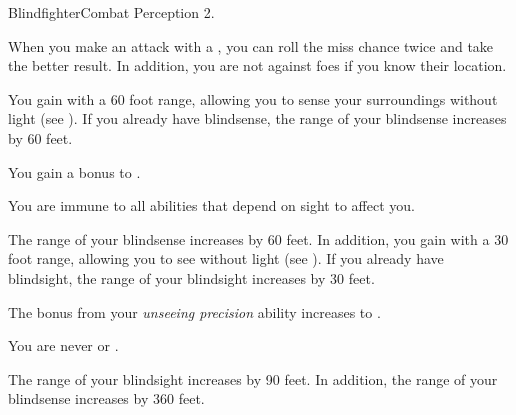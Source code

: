     \begin{feat}{Blindfighter}{Combat}
        \featpre Perception 2.

         When you make an attack with a , you can roll the miss chance twice and take the better result.
        In addition, you are not \partiallyunaware against foes if you know their location.

         You gain  with a 60 foot range, allowing you to sense your surroundings without light (see ).
        If you already have blindsense, the range of your blindsense increases by 60 feet.

         You gain a  bonus to .

         You are immune to all abilities that depend on sight to affect you.

         The range of your blindsense increases by 60 feet.
        In addition, you gain  with a 30 foot range, allowing you to see without light (see ).
        If you already have blindsight, the range of your blindsight increases by 30 feet.

         The bonus from your \textit{unseeing precision} ability increases to .

         You are never \unaware or \partiallyunaware.

         The range of your blindsight increases by 90 feet.
        In addition, the range of your blindsense increases by 360 feet.
    \end{feat}

